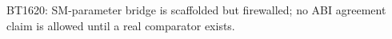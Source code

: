 \begin{center}\small
BT1620: SM-parameter bridge is scaffolded but firewalled; no ABI agreement claim is allowed until a real comparator exists.
\end{center}
